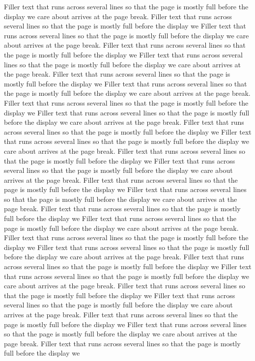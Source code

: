 \documentclass[10pt,twoside]{article}
\begin{document}
Filler text that runs across several lines so that the page is mostly full before the display we care about arrives at the page break. Filler text that runs across several lines so that the page is mostly full before the display we Filler text that runs across several lines so that the page is mostly full before the display we care about arrives at the page break. Filler text that runs across several lines so that the page is mostly full before the display we Filler text that runs across several lines so that the page is mostly full before the display we care about arrives at the page break. Filler text that runs across several lines so that the page is mostly full before the display we Filler text that runs across several lines so that the page is mostly full before the display we care about arrives at the page break. Filler text that runs across several lines so that the page is mostly full before the display we Filler text that runs across several lines so that the page is mostly full before the display we care about arrives at the page break. Filler text that runs across several lines so that the page is mostly full before the display we Filler text that runs across several lines so that the page is mostly full before the display we care about arrives at the page break. Filler text that runs across several lines so that the page is mostly full before the display we Filler text that runs across several lines so that the page is mostly full before the display we care about arrives at the page break. Filler text that runs across several lines so that the page is mostly full before the display we Filler text that runs across several lines so that the page is mostly full before the display we care about arrives at the page break. Filler text that runs across several lines so that the page is mostly full before the display we Filler text that runs across several lines so that the page is mostly full before the display we care about arrives at the page break. Filler text that runs across several lines so that the page is mostly full before the display we Filler text that runs across several lines so that the page is mostly full before the display we care about arrives at the page break. Filler text that runs across several lines so that the page is mostly full before the display we Filler text that runs across several lines so that the page is mostly full before the display we care about arrives at the page break. Filler text that runs across several lines so that the page is mostly full before the display we Filler text that runs across several lines so that the page is mostly full before the display we care about arrives at the page break. Filler text that runs across several lines so that the page is mostly full before the display we Filler text that runs across several lines so that the page is mostly full before the display we care about arrives at the page break. Filler text that runs across several lines so that the page is mostly full before the display we
\end{document}
